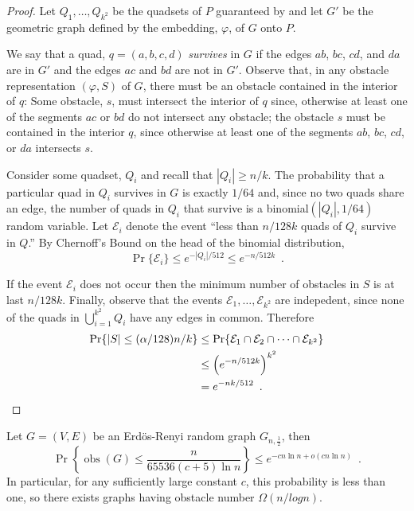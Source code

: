 \documentclass{patmorin}
\DeclareMathOperator{\obs}{obs}
\begin{document}
\begin{proof}
  Let $Q_1,\ldots,Q_{k^2}$ be the quadsets of $P$ guaranteed by
   and let $G'$ be the geometric graph defined by
  the embedding, $\varphi$, of $G$ onto $P$.  

  We say that a quad, $q=(a,b,c,d)$ \emph{survives} in $G$ if the edges
  $ab$, $bc$, $cd$, and $da$ are in $G'$ and the edges $ac$ and $bd$ are
  not in $G'$.  Observe that, in any obstacle representation $(\varphi,S)$
  of $G$, there must be an obstacle contained in the interior of $q$:
  Some obstacle, $s$, must intersect the interior of $q$ since, otherwise
  at least one of the segments $ac$ or $bd$ do not intersect any obstacle;
  the obstacle $s$ must be contained in the interior $q$, since otherwise
  at least one of the segments $ab$, $bc$, $cd$, or $da$ intersects $s$.

  Consider some quadset, $Q_i$ and recall that $|Q_i|\ge n/k$.
  The probability that a particular quad in $Q_i$ survives in $G$ is
  exactly $1/64$ and, since no two quads share an edge, the number of
  quads in $Q_i$ that survive is a binomial$(|Q_i|,1/64)$ random variable.
  Let $\mathcal{E}_i$ denote the event ``less than $n/128k$ quads
  of $Q_i$ survive in $Q$.''  By Chernoff's Bound on the head of the
  binomial distribution,
  \[
    \Pr\{\mathcal{E}_i\}
      \le e^{-|Q_i|/512} \le e^{-n/512k} \enspace .
  \]

  If the event $\mathcal{E}_i$ does not occur then the minimum number of
  obstacles in $S$ is at last $n/128k$.  Finally, observe that the
  events $\mathcal{E}_1,\ldots,\mathcal{E}_{k^2}$ are indepedent, since
  none of the quads in $\bigcup_{i=1}^{k^2} Q_i$ have any edges in common.
  Therefore
  \begin{align*}
    \Pr\{|S|\le (\alpha/128)n/k\} 
      & \le \Pr\{ \mathcal{E}_1\cap \mathcal{E}_2\cap\cdots\cap\mathcal{E}_{k^2}\} \\
      & \le \left(e^{-n/512k}\right)^{k^2} \\
      & = e^{-nk/512} \enspace . \qedhere
  \end{align*}
\end{proof}

\begin{thm}
  Let $G=(V,E)$ be an Erd\"os-Renyi random graph $G_{n,\frac{1}{2}}$, then
  \[
    \Pr\left\{\obs(G) \le \frac{n}{65536(c+5)\ln n}\right\} 
         \le e^{-cn\ln n + o(cn\ln n)} \enspace .
  \]
  In particular, for any sufficiently large constant $c$, this probability
  is less than one, so there exists graphs having obstacle number
  $\Omega(n/log n)$.
\end{thm}
\end{document}
